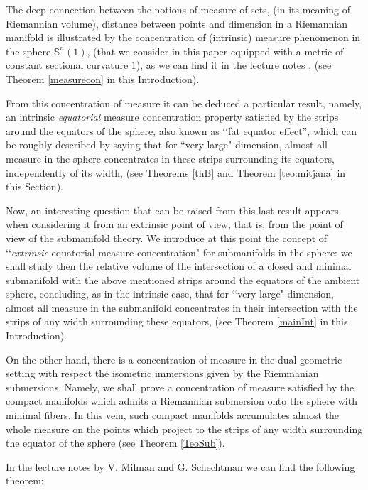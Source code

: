\documentclass{amsart}
\theoremstyle{definition}
\theoremstyle{remark}
\newcommand{\ese}{\mathbb{S}}
\begin{document}
The deep connection between the notions of measure of sets, (in its meaning of Riemannian volume), distance between points and dimension in a Riemannian manifold is illustrated by the concentration of (intrinsic) measure phenomenon in the sphere $\ese^n(1)$, (that we consider in this paper equipped with a metric of constant sectional curvature $1$), as we can find it in the lecture notes \cite{MS}, (see Theorem \ref{measurecon} in this Introduction).

From this concentration of measure  it can be deduced a particular result, namely, an intrinsic {\em equatorial} measure concentration property satisfied by the strips around the equators of the sphere, also known as \lq\lq fat equator effect'', which can be roughly described by saying that for ``very large" dimension, almost all measure in the sphere concentrates in these strips surrounding its equators, independently of its width, (see Theorems \ref{thB} and Theorem \ref{teo:mitjana} in this Section). 

Now, an interesting question that can be raised from this last result appears when considering it from an extrinsic point of view, that is, from the point of view of the submanifold theory. 
We introduce at this point  the concept of \lq\lq {\em extrinsic} equatorial measure concentration"  for submanifolds in the sphere: we shall study then the relative volume of the intersection of a closed and minimal submanifold with the above mentioned strips around the equators of the ambient sphere, concluding, as in the intrinsic case, that for \lq\lq very large" dimension, almost all measure in the submanifold concentrates in their intersection with the strips of any width surrounding these equators, (see Theorem \ref{mainInt} in this Introduction). 


On the other hand, there is a concentration of measure in the dual geometric setting with respect the isometric immersions given by the Riemmanian submersions. Namely, we shall prove a concentration of measure satisfied by the compact manifolds which admits a Riemannian submersion onto the sphere with minimal fibers. In this vein, such compact manifolds
 accumulates almost the whole measure on the  points which project to the strips of any width surrounding the equator of the sphere (see Theorem \ref{TeoSub}).

In the lecture notes by V. Milman and G. Schechtman \cite{MS} we can find the following theorem:
\end{document}
